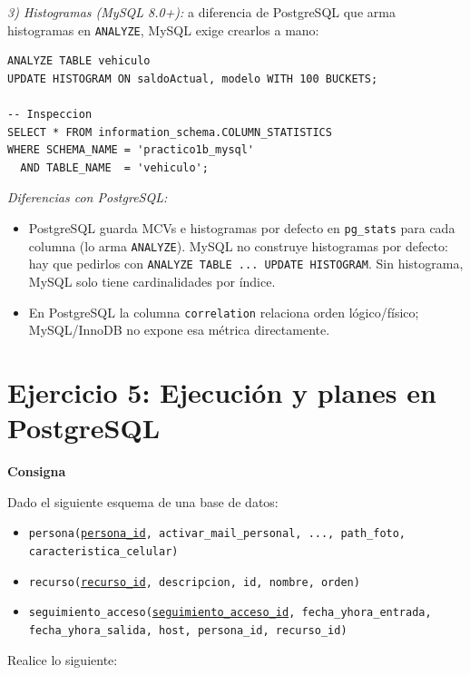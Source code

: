 \documentclass[11pt,a4paper]{article}
\newcommand{\itemcabecera}[1]{\noindent\textbf{#1}\par\medskip}
\newcommand{\bloqueConsigna}{\itemcabecera{Consigna}}
\begin{document}
\textit{3) Histogramas (MySQL 8.0+):} a diferencia de PostgreSQL que arma histogramas en \texttt{ANALYZE}, MySQL exige crearlos a mano:

\begin{lstlisting}
ANALYZE TABLE vehiculo
UPDATE HISTOGRAM ON saldoActual, modelo WITH 100 BUCKETS;

-- Inspeccion
SELECT * FROM information_schema.COLUMN_STATISTICS
WHERE SCHEMA_NAME = 'practico1b_mysql'
  AND TABLE_NAME  = 'vehiculo';
\end{lstlisting}

\textit{Diferencias con PostgreSQL:}

\begin{itemize}
    \item PostgreSQL guarda MCVs e histogramas por defecto en \texttt{pg\_stats} para cada columna (lo arma \texttt{ANALYZE}). MySQL no construye histogramas por defecto: hay que pedirlos con \texttt{ANALYZE TABLE ... UPDATE HISTOGRAM}. Sin histograma, MySQL solo tiene cardinalidades por índice.
    \item En PostgreSQL la columna \texttt{correlation} relaciona orden lógico/físico; MySQL/InnoDB no expone esa métrica directamente.
\end{itemize}

\section{Ejercicio 5: Ejecución y planes en PostgreSQL}

\bloqueConsigna

Dado el siguiente esquema de una base de datos:

\begin{itemize}
    \item \texttt{persona(\underline{persona\_id}, activar\_mail\_personal, ..., path\_foto, caracteristica\_celular)}
    \item \texttt{recurso(\underline{recurso\_id}, descripcion, id, nombre, orden)}
    \item \texttt{seguimiento\_acceso(\underline{seguimiento\_acceso\_id}, fecha\_yhora\_entrada, fecha\_yhora\_salida, host, persona\_id, recurso\_id)}
\end{itemize}

Realice lo siguiente:
\end{document}
